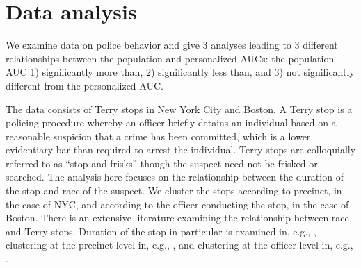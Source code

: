 \documentclass[12pt]{article}
\begin{document}





\section{Data analysis}\label{section:data analysis}

We examine data on police behavior and give 3 analyses leading to 3
different relationships between the population and personalized AUCs:
the population AUC 1) significantly more than, 2) significantly less
than, and 3) not significantly different from the personalized AUC.

The data consists of Terry stops in New York City and Boston. A Terry
stop is a policing procedure whereby an officer  briefly detains an
individual based on a reasonable suspicion that a crime has been
committed, which is a lower evidentiary bar than required to arrest
the individual. Terry stops are colloquially referred to as ``stop and
frisks'' though the suspect need not be frisked or searched. The
analysis here focuses on the relationship between the duration of the
stop and race of the suspect. We cluster the stops according to
precinct, in the case of NYC, and according to the officer conducting
the stop, in the case of Boston. There is an extensive literature
examining the relationship between race and Terry stops. Duration of
the stop in particular is examined in, e.g., \citet{ridgeway2006},
clustering at the precinct level in, e.g., \citet{goel2016}, and clustering at the officer
level in, e.g., \citet{ridgeway2009}.
\end{document}
